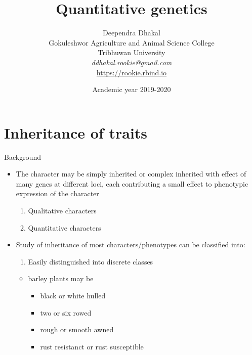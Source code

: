 \documentclass[11pt,dvipsnames,ignorenonframetext,aspectratio=169]{beamer}
\title[]{Quantitative genetics}
\author[
        Deependra Dhakal\\
Gokuleshwor Agriculture and Animal Science College\\
Tribhuwan University\\
\textit{ddhakal.rookie@gmail.com}\\
\url{https://rookie.rbind.io}
    ]{Deependra Dhakal\\
Gokuleshwor Agriculture and Animal Science College\\
Tribhuwan University\\
\textit{ddhakal.rookie@gmail.com}\\
\url{https://rookie.rbind.io}}
\date[
      Academic year 2019-2020
  ]{
      Academic year 2019-2020
        }
\providecommand{\tightlist}{%
  \setlength{\itemsep}{0pt}\setlength{\parskip}{0pt}}
\begin{document}
  \begin{frame}[plain]
  \titlepage
  \end{frame}



\hypertarget{inheritance-of-traits}{%
\section{Inheritance of traits}\label{inheritance-of-traits}}

\begin{frame}{Background}
\protect\hypertarget{background}{}

\begin{itemize}
\tightlist
\item
  The character may be simply inherited or complex inherited with effect
  of many genes at different loci, each contributing a small effect to
  phenotypic expression of the character

  \begin{enumerate}
  \tightlist
  \item
    Qualitative characters
  \item
    Quantitative characters
  \end{enumerate}
\item
  Study of inheritance of most characters/phenotypes can be classified
  into:

  \begin{enumerate}
  \tightlist
  \item
    Easily distinguished into discrete classes
  \end{enumerate}

  \begin{itemize}
  \tightlist
  \item
    barley plants may be

    \begin{itemize}
    \tightlist
    \item
      black or white hulled
    \item
      two or six rowed
    \item
      rough or smooth awned
    \item
      rust resistanct or rust susceptible
    \end{itemize}
  \end{itemize}
\end{itemize}

\end{frame}
\end{document}
